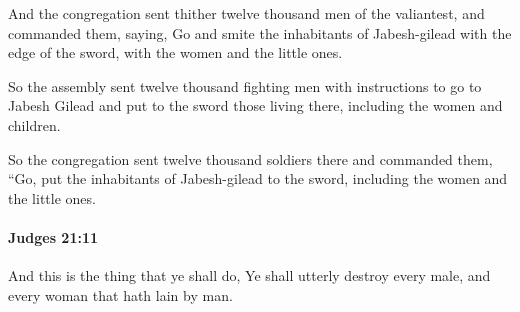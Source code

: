 			\begin{versebox}
					\item[BHS] 
					\item[ASV] And the congregation sent thither twelve thousand men of the valiantest, and commanded them, saying, Go and smite the inhabitants of Jabesh-gilead with the edge of the sword, with the women and the little ones.
					\item[NIV] So the assembly sent twelve thousand fighting men with instructions to go to Jabesh Gilead and put to the sword those living there, including the women and children.
					\item[NRSV] So the congregation sent twelve thousand soldiers there and commanded them, “Go, put the inhabitants of Jabesh-gilead to the sword, including the women and the little ones.
			\end{versebox}

		\paragraph{Judges 21:11} %
			\label{JUDGES-21-11}

			And this is the thing that ye shall do, Ye shall utterly destroy every male, and every woman that hath lain by man.

